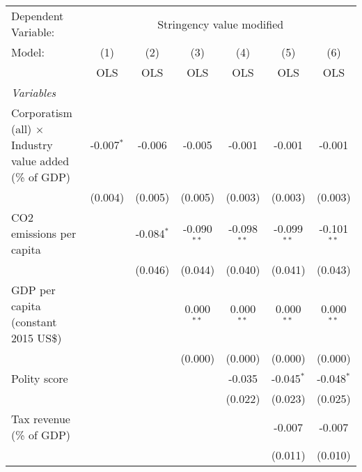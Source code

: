 
\begingroup
\centering
\begin{tabular}{lcccccc}
   \toprule
   Dependent Variable: & \multicolumn{6}{c}{Stringency value modified}\\
   Model:                                                        & (1)          & (2)          & (3)           & (4)           & (5)           & (6)\\  
                                                                 &  OLS         & OLS          & OLS           & OLS           & OLS           & OLS\\  
   \midrule
   \emph{Variables}\\
   Corporatism (all) $\times$ Industry value added (\% of GDP)   & -0.007$^{*}$ & -0.006       & -0.005        & -0.001        & -0.001        & -0.001\\   
                                                                 & (0.004)      & (0.005)      & (0.005)       & (0.003)       & (0.003)       & (0.003)\\   
   CO2 emissions per capita                                      &              & -0.084$^{*}$ & -0.090$^{**}$ & -0.098$^{**}$ & -0.099$^{**}$ & -0.101$^{**}$\\   
                                                                 &              & (0.046)      & (0.044)       & (0.040)       & (0.041)       & (0.043)\\   
   GDP per capita (constant 2015 US\$)                           &              &              & 0.000$^{**}$  & 0.000$^{**}$  & 0.000$^{**}$  & 0.000$^{**}$\\   
                                                                 &              &              & (0.000)       & (0.000)       & (0.000)       & (0.000)\\   
   Polity score                                                  &              &              &               & -0.035        & -0.045$^{*}$  & -0.048$^{*}$\\   
                                                                 &              &              &               & (0.022)       & (0.023)       & (0.025)\\   
   Tax revenue (\% of GDP)                                       &              &              &               &               & -0.007        & -0.007\\   
                                                                 &              &              &               &               & (0.011)       & (0.010)\\   

\end{tabular}
